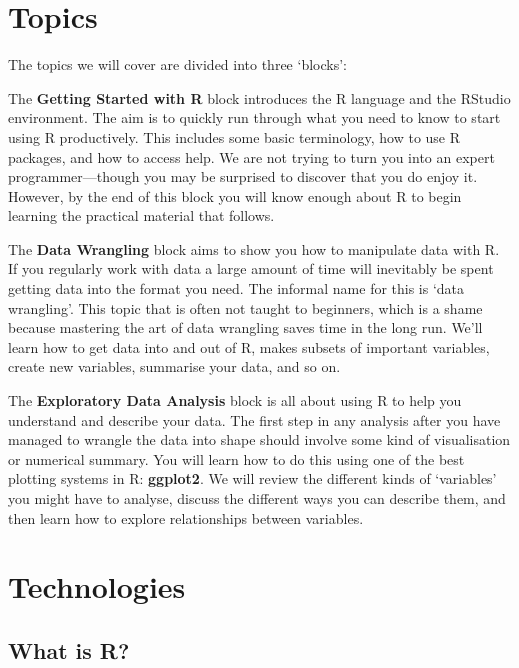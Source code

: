 \documentclass[
]{book}
\begin{document}
\hypertarget{topics}{%
\section*{Topics}\label{topics}}

The topics we will cover are divided into three `blocks':

The \textbf{Getting Started with R} block introduces the R language and the RStudio environment. The aim is to quickly run through what you need to know to start using R productively. This includes some basic terminology, how to use R packages, and how to access help. We are not trying to turn you into an expert programmer---though you may be surprised to discover that you do enjoy it. However, by the end of this block you will know enough about R to begin learning the practical material that follows.

The \textbf{Data Wrangling} block aims to show you how to manipulate data with R. If you regularly work with data a large amount of time will inevitably be spent getting data into the format you need. The informal name for this is `data wrangling'. This topic that is often not taught to beginners, which is a shame because mastering the art of data wrangling saves time in the long run. We'll learn how to get data into and out of R, makes subsets of important variables, create new variables, summarise your data, and so on.

The \textbf{Exploratory Data Analysis} block is all about using R to help you understand and describe your data. The first step in any analysis after you have managed to wrangle the data into shape should involve some kind of visualisation or numerical summary. You will learn how to do this using one of the best plotting systems in R: \textbf{ggplot2}. We will review the different kinds of `variables' you might have to analyse, discuss the different ways you can describe them, and then learn how to explore relationships between variables.

\hypertarget{technologies}{%
\section*{Technologies}\label{technologies}}

\hypertarget{what-is-r}{%
\subsection*{What is R?}\label{what-is-r}}
\end{document}
